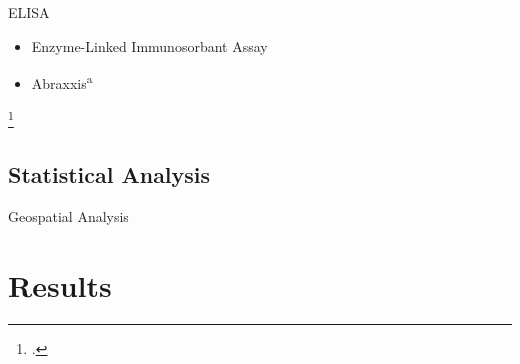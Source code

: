 \begin{frame}{ELISA}
	\begin{itemize}
		\item Enzyme-Linked Immunosorbant Assay
		\item Abraxxis\textsuperscript{a}
	\end{itemize}

	
\end{frame}
\footcitetext{[a], noauthor_saxitoxin_nodate}
\subsection{Statistical Analysis}
\begin{frame}{Geospatial Analysis}

\end{frame}
\section{Results}
